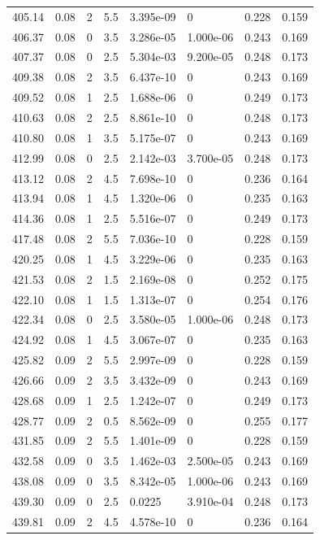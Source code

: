 \documentclass[preview]{standalone}
\begin{document}
{{{{{{\begin{tabular}{L{1.2cm}C{1.2cm} C{0.3cm}C{0.5cm} C{1.4cm}C{1.4cm} C{1.4cm}C{1.4cm}}
  405.14  &  0.08  & 2     & 5.5 &  3.395e-09  & 0  & 0.228 &  0.159   \\ 
  406.37  &  0.08  & 0     & 3.5 &  3.286e-05  & 1.000e-06  & 0.243 &  0.169   \\ 
  407.37  &  0.08  & 0     & 2.5 &  5.304e-03  & 9.200e-05  & 0.248 &  0.173   \\ 
  409.38  &  0.08  & 2     & 3.5 &  6.437e-10  & 0  & 0.243 &  0.169   \\ 
  409.52  &  0.08  & 1     & 2.5 &  1.688e-06  & 0  & 0.249 &  0.173   \\ 
  410.63  &  0.08  & 2     & 2.5 &  8.861e-10  & 0  & 0.248 &  0.173   \\ 
  410.80  &  0.08  & 1     & 3.5 &  5.175e-07  & 0  & 0.243 &  0.169   \\ 
  412.99  &  0.08  & 0     & 2.5 &  2.142e-03  & 3.700e-05  & 0.248 &  0.173   \\ 
  413.12  &  0.08  & 2     & 4.5 &  7.698e-10  & 0  & 0.236 &  0.164   \\ 
  413.94  &  0.08  & 1     & 4.5 &  1.320e-06  & 0  & 0.235 &  0.163   \\ 
  414.36  &  0.08  & 1     & 2.5 &  5.516e-07  & 0  & 0.249 &  0.173   \\ 
  417.48  &  0.08  & 2     & 5.5 &  7.036e-10  & 0  & 0.228 &  0.159   \\ 
  420.25  &  0.08  & 1     & 4.5 &  3.229e-06  & 0  & 0.235 &  0.163   \\ 
  421.53  &  0.08  & 2     & 1.5 &  2.169e-08  & 0  & 0.252 &  0.175   \\ 
  422.10  &  0.08  & 1     & 1.5 &  1.313e-07  & 0  & 0.254 &  0.176   \\ 
  422.34  &  0.08  & 0     & 2.5 &  3.580e-05  & 1.000e-06  & 0.248 &  0.173   \\ 
  424.92  &  0.08  & 1     & 4.5 &  3.067e-07  & 0  & 0.235 &  0.163   \\ 
  425.82  &  0.09  & 2     & 5.5 &  2.997e-09  & 0  & 0.228 &  0.159   \\ 
  426.66  &  0.09  & 2     & 3.5 &  3.432e-09  & 0  & 0.243 &  0.169   \\ 
  428.68  &  0.09  & 1     & 2.5 &  1.242e-07  & 0  & 0.249 &  0.173   \\ 
  428.77  &  0.09  & 2     & 0.5 &  8.562e-09  & 0  & 0.255 &  0.177   \\ 
  431.85  &  0.09  & 2     & 5.5 &  1.401e-09  & 0  & 0.228 &  0.159   \\ 
  432.58  &  0.09  & 0     & 3.5 &  1.462e-03  & 2.500e-05  & 0.243 &  0.169   \\ 
  438.08  &  0.09  & 0     & 3.5 &  8.342e-05  & 1.000e-06  & 0.243 &  0.169   \\ 
  439.30  &  0.09  & 0     & 2.5 &  0.0225  & 3.910e-04  & 0.248 &  0.173   \\ 
  439.81  &  0.09  & 2     & 4.5 &  4.578e-10  & 0  & 0.236 &  0.164   \\ 
\hline 
\end{tabular} 

}}}}}}
\end{document}
